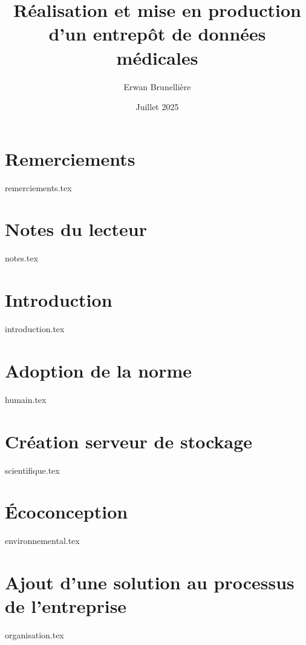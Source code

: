 \documentclass[11pt]{memoireStyle}
\title{Réalisation et mise en production d'un entrepôt de données médicales}
\author{Erwan Brunellière}
\affil{IDIA 2025}
\affil{Polytech Nantes}
\date{Juillet 2025}
\begin{document}
\frontPage

\setStyle

\chapter*{Remerciements}
{remerciements.tex}

\chapter*{Notes du lecteur}
{notes.tex}

\printnoidxglossaries



\chapter{Introduction}
{introduction.tex}

\chapter{Adoption de la norme}
{humain.tex}

\chapter{Création serveur de stockage}
{scientifique.tex}

\chapter{Écoconception}
{environnemental.tex}

\chapter{Ajout d'une solution au processus de l'entreprise}
{organisation.tex}
\end{document}
